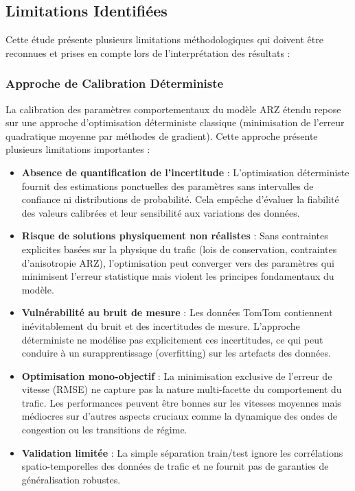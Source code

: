 \subsection{Limitations Identifiées}
\label{subsec:limitations_identifiees}
Cette étude présente plusieurs limitations méthodologiques qui doivent être reconnues et prises en compte lors de l'interprétation des résultats :

\subsubsection{Approche de Calibration Déterministe}
La calibration des paramètres comportementaux du modèle ARZ étendu repose sur une approche d'optimisation déterministe classique (minimisation de l'erreur quadratique moyenne par méthodes de gradient). Cette approche présente plusieurs limitations importantes :

\begin{itemize}
  \item \textbf{Absence de quantification de l'incertitude} : L'optimisation déterministe fournit des estimations ponctuelles des paramètres sans intervalles de confiance ni distributions de probabilité. Cela empêche d'évaluer la fiabilité des valeurs calibrées et leur sensibilité aux variations des données.
  \item \textbf{Risque de solutions physiquement non réalistes} : Sans contraintes explicites basées sur la physique du trafic (lois de conservation, contraintes d'anisotropie ARZ), l'optimisation peut converger vers des paramètres qui minimisent l'erreur statistique mais violent les principes fondamentaux du modèle.
  \item \textbf{Vulnérabilité au bruit de mesure} : Les données TomTom contiennent inévitablement du bruit et des incertitudes de mesure. L'approche déterministe ne modélise pas explicitement ces incertitudes, ce qui peut conduire à un surapprentissage (overfitting) sur les artefacts des données.
  \item \textbf{Optimisation mono-objectif} : La minimisation exclusive de l'erreur de vitesse (RMSE) ne capture pas la nature multi-facette du comportement du trafic. Les performances peuvent être bonnes sur les vitesses moyennes mais médiocres sur d'autres aspects cruciaux comme la dynamique des ondes de congestion ou les transitions de régime.
  \item \textbf{Validation limitée} : La simple séparation train/test ignore les corrélations spatio-temporelles des données de trafic et ne fournit pas de garanties de généralisation robustes.
\end{itemize}

